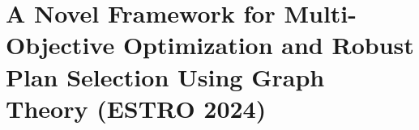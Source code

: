 \section[Novel Dosimetry Automation Approach with Graph Theory]{A Novel Framework for Multi-Objective Optimization and Robust Plan Selection Using Graph Theory (ESTRO 2024)}

